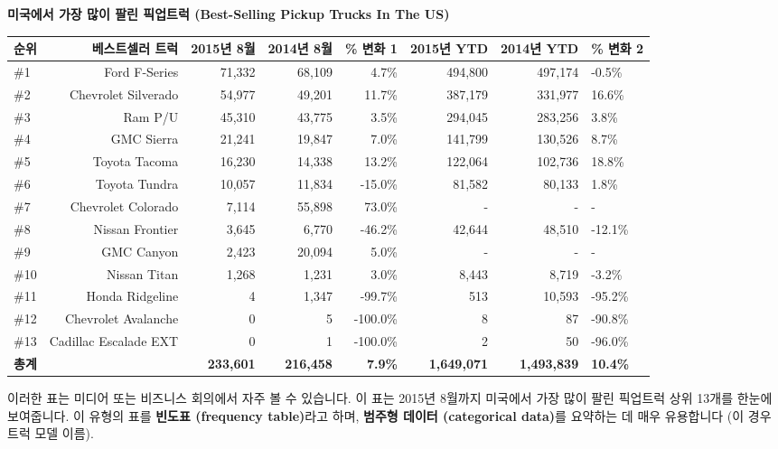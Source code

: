 \documentclass[11pt,a4paper]{article}
\begin{document}
\begin{examplebox}
\textbf{미국에서 가장 많이 팔린 픽업트럭 (Best-Selling Pickup Trucks In The US)}

\begin{center}
\label{tab:pickup_trucks}
\begin{adjustbox}{width=\textwidth,center}
\begin{tabular}{lrrrrrr}
\toprule
\textbf{순위} & \textbf{베스트셀러 트럭} & \textbf{2015년 8월} & \textbf{2014년 8월} & \textbf{\% 변화 1} & \textbf{2015년 YTD} & \textbf{2014년 YTD} & \textbf{\% 변화 2} \\
\midrule
\#1 & Ford F-Series & 71,332 & 68,109 & 4.7\% & 494,800 & 497,174 & -0.5\% \\
\#2 & Chevrolet Silverado & 54,977 & 49,201 & 11.7\% & 387,179 & 331,977 & 16.6\% \\
\#3 & Ram P/U & 45,310 & 43,775 & 3.5\% & 294,045 & 283,256 & 3.8\% \\
\#4 & GMC Sierra & 21,241 & 19,847 & 7.0\% & 141,799 & 130,526 & 8.7\% \\
\#5 & Toyota Tacoma & 16,230 & 14,338 & 13.2\% & 122,064 & 102,736 & 18.8\% \\
\#6 & Toyota Tundra & 10,057 & 11,834 & -15.0\% & 81,582 & 80,133 & 1.8\% \\
\#7 & Chevrolet Colorado & 7,114 & 55,898 & 73.0\% & - & - & - \\ %
\#8 & Nissan Frontier & 3,645 & 6,770 & -46.2\% & 42,644 & 48,510 & -12.1\% \\
\#9 & GMC Canyon & 2,423 & 20,094 & 5.0\% & - & - & - \\ %
\#10 & Nissan Titan & 1,268 & 1,231 & 3.0\% & 8,443 & 8,719 & -3.2\% \\
\#11 & Honda Ridgeline & 4 & 1,347 & -99.7\% & 513 & 10,593 & -95.2\% \\
\#12 & Chevrolet Avalanche & 0 & 5 & -100.0\% & 8 & 87 & -90.8\% \\
\#13 & Cadillac Escalade EXT & 0 & 1 & -100.0\% & 2 & 50 & -96.0\% \\
\midrule
\textbf{총계} & & \textbf{233,601} & \textbf{216,458} & \textbf{7.9\%} & \textbf{1,649,071} & \textbf{1,493,839} & \textbf{10.4\%} \\
\bottomrule
\end{tabular}
\end{adjustbox}
\end{center}
이러한 표는 미디어 또는 비즈니스 회의에서 자주 볼 수 있습니다. 이 표는 2015년 8월까지 미국에서 가장 많이 팔린 픽업트럭 상위 13개를 한눈에 보여줍니다. 이 유형의 표를 \textbf{빈도표 (frequency table)}라고 하며, \textbf{범주형 데이터 (categorical data)}를 요약하는 데 매우 유용합니다 (이 경우 트럭 모델 이름).


\end{examplebox}
\end{document}
